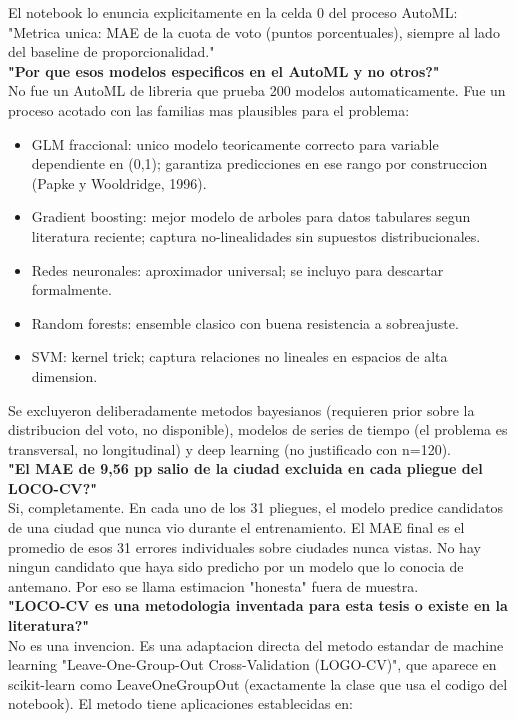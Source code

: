 \documentclass[11pt,a4paper]{article}
\begin{document}
{{{El notebook lo enuncia explicitamente en la celda 0 del proceso AutoML: "Metrica unica: MAE de la cuota de voto (puntos porcentuales), siempre al lado del baseline de proporcionalidad."\\[2pt]

\textbf{"Por que esos modelos especificos en el AutoML y no otros?"}\\[2pt]
No fue un AutoML de libreria que prueba 200 modelos automaticamente. Fue un proceso acotado con las familias mas plausibles para el problema:\\[2pt]

\begin{itemize}[noitemsep,topsep=2pt]
\item GLM fraccional: unico modelo teoricamente correcto para variable dependiente en (0,1); garantiza predicciones en ese rango por construccion (Papke y Wooldridge, 1996).
\item Gradient boosting: mejor modelo de arboles para datos tabulares segun literatura reciente; captura no-linealidades sin supuestos distribucionales.
\item Redes neuronales: aproximador universal; se incluyo para descartar formalmente.
\item Random forests: ensemble clasico con buena resistencia a sobreajuste.
\item SVM: kernel trick; captura relaciones no lineales en espacios de alta dimension.
\end{itemize}

Se excluyeron deliberadamente metodos bayesianos (requieren prior sobre la distribucion del voto, no disponible), modelos de series de tiempo (el problema es transversal, no longitudinal) y deep learning (no justificado con n=120).\\[2pt]

\textbf{"El MAE de 9,56 pp salio de la ciudad excluida en cada pliegue del LOCO-CV?"}\\[2pt]
Si, completamente. En cada uno de los 31 pliegues, el modelo predice candidatos de una ciudad que nunca vio durante el entrenamiento. El MAE final es el promedio de esos 31 errores individuales sobre ciudades nunca vistas. No hay ningun candidato que haya sido predicho por un modelo que lo conocia de antemano. Por eso se llama estimacion "honesta" fuera de muestra.\\[2pt]

\textbf{"LOCO-CV es una metodologia inventada para esta tesis o existe en la literatura?"}\\[2pt]
No es una invencion. Es una adaptacion directa del metodo estandar de machine learning "Leave-One-Group-Out Cross-Validation (LOGO-CV)", que aparece en scikit-learn como LeaveOneGroupOut (exactamente la clase que usa el codigo del notebook). El metodo tiene aplicaciones establecidas en:\\[2pt]

}}}
\end{document}
